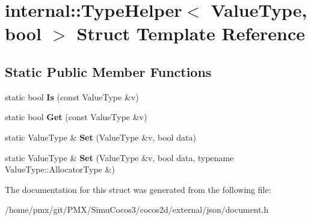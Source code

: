 \hypertarget{structinternal_1_1TypeHelper_3_01ValueType_00_01bool_01_4}{}\section{internal\+:\+:Type\+Helper$<$ Value\+Type, bool $>$ Struct Template Reference}
\label{structinternal_1_1TypeHelper_3_01ValueType_00_01bool_01_4}
\subsection*{Static Public Member Functions}
\begin{DoxyCompactItemize}
\item 
\mbox{\label{structinternal_1_1TypeHelper_3_01ValueType_00_01bool_01_4_aa73fb8b4ed649706f7f9165401f89c27}} 
static bool {\bfseries Is} (const Value\+Type \&v)
\item 
\mbox{\label{structinternal_1_1TypeHelper_3_01ValueType_00_01bool_01_4_aed612b233e5985d049248b414fb0034a}} 
static bool {\bfseries Get} (const Value\+Type \&v)
\item 
\mbox{\label{structinternal_1_1TypeHelper_3_01ValueType_00_01bool_01_4_a4bfa644e57e7d725468ed78103c1579a}} 
static Value\+Type \& {\bfseries Set} (Value\+Type \&v, bool data)
\item 
\mbox{\label{structinternal_1_1TypeHelper_3_01ValueType_00_01bool_01_4_a01a2bdf4117fb767c8d703be9e0f5f1d}} 
static Value\+Type \& {\bfseries Set} (Value\+Type \&v, bool data, typename Value\+Type\+::\+Allocator\+Type \&)
\end{DoxyCompactItemize}


The documentation for this struct was generated from the following file\+:\begin{DoxyCompactItemize}
\item 
/home/pmx/git/\+P\+M\+X/\+Simu\+Cocos3/cocos2d/external/json/document.\+h\end{DoxyCompactItemize}
